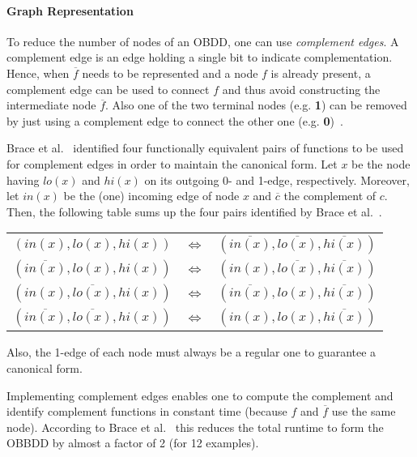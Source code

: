 \documentclass{vldb}
\begin{document}
\paragraph*{Graph Representation}
\mbox{} %

To reduce the number of nodes of an OBDD, one can use \textit{complement edges}.
A complement edge is an edge holding a single bit to indicate complementation.
Hence, when $\overline{f}$ needs to be represented and a node $f$ is already
present, a complement edge can be used to connect $f$ and thus avoid
constructing the intermediate node $\overline{f}$. Also one of the two terminal
nodes (e.g. \textbf{1}) can be removed by just using a complement edge to connect
the other one (e.g. \textbf{0})~\cite{BRACE90}.

Brace et al.~\cite{BRACE90} identified four functionally equivalent pairs of
functions to be used for complement edges in order to maintain the canonical form.
Let $x$ be the node having $lo(x)$ and $hi(x)$ on its outgoing 0- and 1-edge,
respectively. Moreover, let $in(x)$ be the (one) incoming edge of node $x$ and
$\overline{c}$ the complement of $c$. Then, the following table sums up the
four pairs identified by Brace et al.~\cite{BRACE90}.

\begin{center}
    \begin{tabular}{lll}
        $\left(in(x), lo(x), hi(x)\right)$ & $\Leftrightarrow$ & $\left(\overline{in(x)}, \overline{lo(x)}, \overline{hi(x)}\right)$ \tabularnewline
        $\left(\overline{in(x)}, lo(x), hi(x)\right)$ & $\Leftrightarrow$ & $\left(in(x), \overline{lo(x)}, \overline{hi(x)}\right)$ \tabularnewline
        $\left(in(x), \overline{lo(x)}, hi(x)\right)$ & $\Leftrightarrow$ & $\left(\overline{in(x)}, lo(x), \overline{hi(x)}\right)$ \tabularnewline
        $\left(\overline{in(x)}, \overline{lo(x)}, hi(x)\right)$ & $\Leftrightarrow$ & $\left(in(x), lo(x), \overline{hi(x)}\right)$ \tabularnewline
    \end{tabular}
\end{center}

Also, the 1-edge of each node must always be a regular one to guarantee a
canonical form.

Implementing complement edges enables one to compute the complement and identify
complement functions in constant time (because $f$ and $\overline{f}$ use the same
node). According to Brace et al.~\cite{BRACE90} this reduces the total runtime
to form the OBBDD by almost a factor of 2 (for 12 examples).
\end{document}
